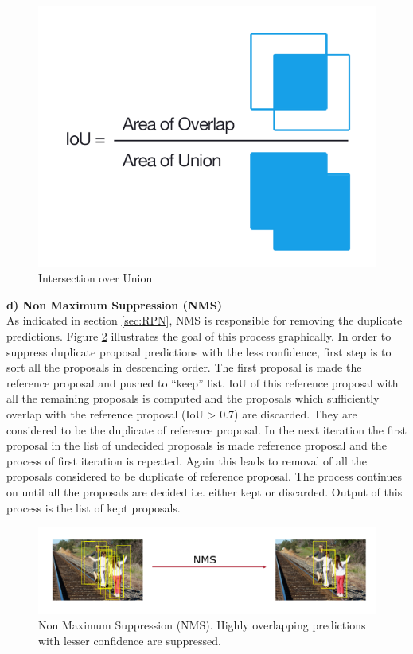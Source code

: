 \begin{figure}
    \centering
    \includegraphics[width=0.5\linewidth]{images/iou.PNG}
    \caption{Intersection over Union}
    \label{fig:iou}
\end{figure}


\textbf{d) Non Maximum Suppression (NMS)} \\
As indicated in section \ref{sec:RPN}, NMS is responsible for removing the duplicate predictions. Figure \ref{fig:nms} illustrates the goal of this process graphically. In order to suppress duplicate proposal predictions with the less confidence, first step is to sort all the proposals in descending order. The first proposal is made  the reference proposal and pushed to ``keep'' list. IoU of this reference proposal with all the remaining proposals is computed and the proposals which sufficiently overlap with the reference proposal (IoU > 0.7) are discarded. They are considered to be the duplicate of reference proposal. In the next iteration the first proposal in the list of undecided proposals is made reference proposal and the process of first iteration is repeated. Again this leads to removal of all the proposals considered to be duplicate of reference proposal. The process continues on until all the proposals are decided i.e. either kept or discarded. Output of this process is the list of kept proposals. 


\begin{figure}
    \centering
    \includegraphics[width=\linewidth]{images/nms.PNG}
    \caption[Non Maximum Suppression (NMS)]{Non Maximum Suppression (NMS). Highly overlapping predictions with lesser confidence are suppressed.}
    \label{fig:nms}
\end{figure}

